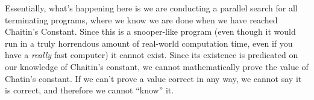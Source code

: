 \documentclass{article}
\begin{document}
Essentially, what's happening here is we are conducting a parallel search for all terminating programs, where we know we are done when we have reached Chaitin's Constant. Since this is a snooper-like program (even though it would run in a truly horrendous amount of real-world computation time, even if you have a \textit{really} fast computer) it cannot exist. Since its existence is predicated on our knowledge of Chaitin's constant, we cannot mathematically prove the value of Chatin's constant. If we can't prove a value correct in any way, we cannot say it is correct, and therefore we cannot “know” it.
\end{document}
